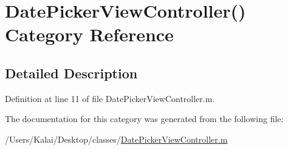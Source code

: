 \hypertarget{category_date_picker_view_controller_07_08}{\section{Date\-Picker\-View\-Controller() Category Reference}
\label{category_date_picker_view_controller_07_08}
}


\subsection{Detailed Description}


Definition at line 11 of file Date\-Picker\-View\-Controller.\-m.



The documentation for this category was generated from the following file\-:\begin{DoxyCompactItemize}
\item 
/\-Users/\-Kalai/\-Desktop/classes/\hyperlink{_date_picker_view_controller_8m}{Date\-Picker\-View\-Controller.\-m}\end{DoxyCompactItemize}
